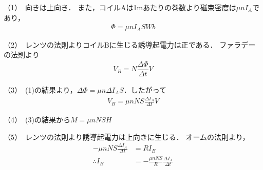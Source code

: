 \begin{comment}

\end{comment}
\noindent （1）\,
向きは上向き．
また，コイルAは1mあたりの巻数\nn より磁束密度は$\mu nI_A$であり，
\begin{align*}
  \varPhi  = \mu nI_A S\unit{Wb}
\end{align*}

\noindent （2）\,
レンツの法則よりコイルBに生じる誘導起電力は正である．
ファラデーの法則より
\begin{align*}
  V_B = N\dfrac{\Delta\varPhi}{\Delta t}\unit{V}
\end{align*}

\noindent （3）\,
(1)の結果より，$\Delta\varPhi = \mu n\Delta I_A S$．したがって
\begin{align*}
  V_B = \mu nNS \frac{\Delta I_A}{\Delta t}\unit{V}
\end{align*}

\noindent （4）\,
(3)の結果から$M=\mu nNS\unit{H}$

\noindent （5）\,
レンツの法則より誘導起電力は上向きに生じる．
オームの法則より，
\begin{align*}
  -\mu nNS\frac{\Delta I_A}{\Delta t} &= RI_B\\
  \therefore I_B &= -\frac{\mu nNS}{R}\frac{\Delta I_A}{\Delta t}
\end{align*}


